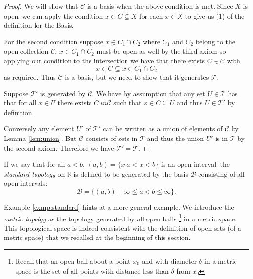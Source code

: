 \begin{proof}
  We will show that $\mathscr{C}$ is a basis when the above condition
  is met. Since $X$ is open, we can apply the condition $x \in C
  \subseteq X$ for each $x \in X$ to give us (1) of the definition for
  the Basis.

  For the second condition suppose $x \in C_1 \cap C_2$ where $C_1$
  and $C_2$ belong to the open collection $\mathscr{C}$. $x \in C_1
  \cap C_2$ must be open as well by the third axiom so applying our
  condition to the intersection we have that there exists $C \in
  \mathscr{C}$ with
  \[
    x \in C \subseteq x \in C_1 \cap C_2
  \]
  as required. Thus $\mathscr{C}$ is a basis, but we need to show that
  it generates $\mathscr{T}$.

  Suppose $\mathscr{T}'$ is generated by $\mathscr{C}$. We have by
  assumption that any set $U \in \mathscr{T}$ has that for all $x \in
  U$ there exists $C\ in \mathscr{C}$ such that $x \in C \subseteq U$
  and thus $U \in \mathscr{T}'$ by definition.

  Conversely any element $U'$ of $\mathscr{T}'$ can be written as a
  union of elements of $\mathscr{C}$ by Lemma \ref{lem:union}. But
  $\mathscr{C}$ consists of sets in $\mathscr{T}$ and thus the union
  $U'$ is in $\mathscr{T}$ by the second axiom. Therefore we have
  $\mathscr{T}' = \mathscr{T}$.
\end{proof}

\begin{exmp}
  \label{exmp:standard}
  If we say that for all $a<b$, $(a,b) = \{x | a < x <b \}$ is an open
  interval, the \emph{standard topology} on $\mathbb{R}$ is defined to be
  generated by the basis $\mathscr{B}$ consisting of all open
  intervals:
  \[
    \mathscr{B} = \{(a,b)| -\infty \leq a < b \leq \infty\}.
  \]
\end{exmp}

\begin{exmp}
  \label{exmp:metric}
  Example \ref{exmp:standard} hints at a more general example. We
  introduce the \emph{metric topolgy} as the topology generated by all
  open balls \footnote{Recall that an open ball about a point $x_0$
    and with diameter $\delta$ in a metric space is the set of all
    points with distance less than $\delta$ from $x_0$} in a metric
  space. This topological space is indeed consistent with the
  definition of open sets (of a metric space) that we recalled at the
  beginning of this section.
\end{exmp}


